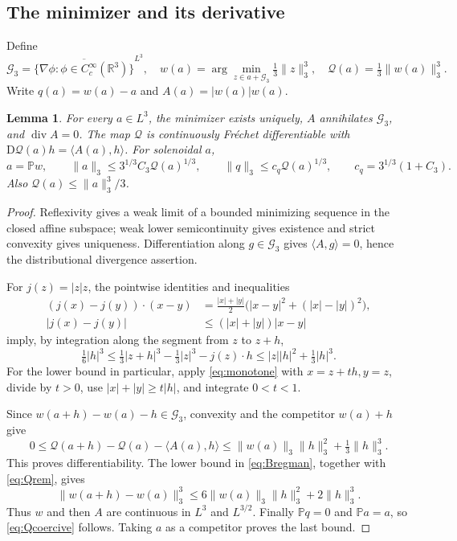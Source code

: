 \documentclass[11pt,a4paper]{article}
\newtheorem{lemma}[theorem]{Lemma}
\theoremstyle{definition}\newtheorem{definition}[theorem]{Definition}
\theoremstyle{remark}\newtheorem{remark}[theorem]{Remark}
\newcommand{\R}{\mathbb R}
\newcommand{\PP}{\mathbb P}
\newcommand{\G}{\mathcal G_3}
\newcommand{\Q}{\mathcal Q}
\newcommand{\norm}[1]{\lVert #1\rVert}
\newcommand{\ip}[2]{\langle #1,#2\rangle}
\newcommand{\diver}{\operatorname{div}}
\numberwithin{equation}{section}
\begin{document}
\subsection{The minimizer and its derivative}
Define
\begin{equation}\label{eq:Qdef}
 \G=\overline{\{\nabla\phi:\phi\in C_c^\infty(\R^3)\}}^{L^3},
 \quad w(a)=\arg\min_{z\in a+\G}\tfrac13\norm z_3^3,
 \quad\Q(a)=\tfrac13\norm{w(a)}_3^3.
\end{equation}
Write $q(a)=w(a)-a$ and $A(a)=|w(a)|w(a)$.
\begin{lemma}\label{lem:Qbasic}
For every $a\in L^3$, the minimizer exists uniquely, $A$ annihilates $\G$, and $\diver A=0$. The map $\Q$ is continuously Fr\'echet differentiable with $\mathrm D\Q(a)h=\ip{A(a)}h$. For solenoidal $a$,
\begin{equation}\label{eq:Qcoercive}
 a=\PP w,\qquad
 \norm a_3\le3^{1/3}C_3\Q(a)^{1/3},\qquad
 \norm q_3\le c_q\Q(a)^{1/3},\qquad c_q=3^{1/3}(1+C_3).
\end{equation}
Also $\Q(a)\le\norm a_3^3/3$.
\end{lemma}
\begin{proof}
Reflexivity gives a weak limit of a bounded minimizing sequence in the closed affine subspace; weak lower semicontinuity gives existence and strict convexity gives uniqueness. Differentiation along $g\in\G$ gives $\ip Ag=0$, hence the distributional divergence assertion.

For $j(z)=|z|z$, the pointwise identities and inequalities
\begin{align}
 (j(x)-j(y))\cdot(x-y)
 &=\frac{|x|+|y|}{2}\bigl(|x-y|^2+(|x|-|y|)^2\bigr),\label{eq:monotone}\\
 |j(x)-j(y)|&\le(|x|+|y|)|x-y|\label{eq:jLip}
\end{align}
imply, by integration along the segment from $z$ to $z+h$,
\begin{equation}\label{eq:Bregman}
 \tfrac16|h|^3\le\tfrac13|z+h|^3-\tfrac13|z|^3-j(z)\cdot h
 \le |z||h|^2+\tfrac13|h|^3.
\end{equation}
For the lower bound in particular, apply \eqref{eq:monotone} with $x=z+th,y=z$, divide by $t>0$, use $|x|+|y|\ge t|h|$, and integrate $0<t<1$.

Since $w(a+h)-w(a)-h\in\G$, convexity and the competitor $w(a)+h$ give
\begin{equation}\label{eq:Qrem}
 0\le\Q(a+h)-\Q(a)-\ip{A(a)}h
 \le\norm{w(a)}_3\norm h_3^2+\tfrac13\norm h_3^3.
\end{equation}
This proves differentiability. The lower bound in \eqref{eq:Bregman}, together with \eqref{eq:Qrem}, gives
\[
 \norm{w(a+h)-w(a)}_3^3
 \le6\norm{w(a)}_3\norm h_3^2+2\norm h_3^3.
\]
Thus $w$ and then $A$ are continuous in $L^3$ and $L^{3/2}$. Finally $\PP q=0$ and $\PP a=a$, so \eqref{eq:Qcoercive} follows. Taking $a$ as a competitor proves the last bound.
\end{proof}
\end{document}

